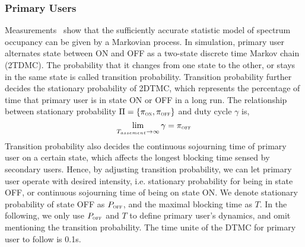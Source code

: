 \subsubsection*{Primary Users}
Measurements~\cite{ProbabilityAndComputing, dsa_model_markov_2006} show that the sufficiently accurate statistic model of spectrum occupancy can be given by a Markovian process.
In simulation, primary user alternates state between ON and OFF as a two-state discrete time Markov chain (2TDMC).
The probability that it changes from one state to the other, or stays in the same state is called transition probability.
Transition probability further decides the stationary probability of 2DTMC, which represents the percentage of time that primary user is in state ON or OFF in a long run.
The relationship between stationary probability $\Pi=\{\pi_{\textsc{\tiny ON}}, \pi_{\textsc{\tiny OFF}}\}$ and duty cycle $\gamma$ is, 
\begin{equation}
\label{stationary_probability}
\lim\limits_{T_{assement} \to \infty }{\gamma} = \pi_{\textsc{\tiny OFF}}
\end{equation}
Transition probability also decides the continuous sojourning time of primary user on a certain state, which affects the longest blocking time sensed by secondary users.
Hence, by adjusting transition probability, we can let primary user operate with desired intensity, i.e. stationary probability for being in state OFF, or continuous sojourning time of being on state ON.
We denote stationary probability of state OFF as $P_{\textsc{\tiny OFF}}$, and the maximal blocking time as $T$.
In the following, we only use $P_{\textsc{\tiny OFF}}$ and $T$ to define primary user's dynamics, and omit mentioning the transition probability.
The time unite of the DTMC for primary user to follow is 0.1s.

